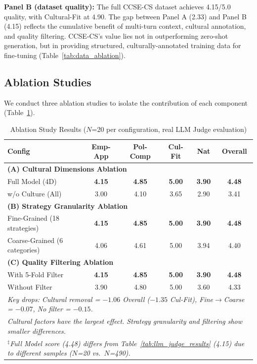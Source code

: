 \documentclass[11pt]{article}
\begin{document}
\textbf{Panel B (dataset quality):} The full CCSE-CS dataset achieves 4.15/5.0 quality, with Cultural-Fit at 4.90. The gap between Panel A (2.33) and Panel B (4.15) reflects the cumulative benefit of multi-turn context, cultural annotation, and quality filtering. CCSE-CS's value lies not in outperforming zero-shot generation, but in providing structured, culturally-annotated training data for fine-tuning (Table~\ref{tab:data_ablation}).

\subsection{Ablation Studies}

We conduct three ablation studies to isolate the contribution of each component (Table~\ref{tab:ablation_results}).

\begin{table}[t]
\centering
\caption{Ablation Study Results ($N$=20 per configuration, real LLM Judge evaluation)}
\label{tab:ablation_results}
\begin{tabular}{lccccc}
\toprule
\textbf{Config} & \textbf{Emp-App} & \textbf{Pol-Comp} & \textbf{Cul-Fit} & \textbf{Nat} & \textbf{Overall} \\
\midrule
\multicolumn{6}{l}{\textbf{(A) Cultural Dimensions Ablation}} \\
Full Model (4D) & \textbf{4.15} & \textbf{4.85} & \textbf{5.00} & \textbf{3.90} & \textbf{4.48} \\
w/o Culture (All) & 3.00 & 4.10 & 3.65 & 2.90 & 3.41 \\
\midrule
\multicolumn{6}{l}{\textbf{(B) Strategy Granularity Ablation}} \\
Fine-Grained (18 strategies) & \textbf{4.15} & \textbf{4.85} & \textbf{5.00} & \textbf{3.90} & \textbf{4.48} \\
Coarse-Grained (6 categories) & 4.06 & 4.61 & 5.00 & 3.94 & 4.40 \\
\midrule
\multicolumn{6}{l}{\textbf{(C) Quality Filtering Ablation}} \\
With 5-Fold Filter & \textbf{4.15} & \textbf{4.85} & \textbf{5.00} & \textbf{3.90} & \textbf{4.48} \\
Without Filter & 3.90 & 4.80 & 5.00 & 3.60 & 4.33 \\
\midrule
\multicolumn{6}{l}{\footnotesize \textit{Key drops: Cultural removal = $-1.06$ Overall ($-1.35$ Cul-Fit), Fine$\to$Coarse = $-0.07$, No filter = $-0.15$.}} \\
\multicolumn{6}{l}{\footnotesize \textit{Cultural factors have the largest effect. Strategy granularity and filtering show smaller differences.}} \\
\multicolumn{6}{l}{\footnotesize \textit{$^{\ddagger}$Full Model score (4.48) differs from Table~\ref{tab:llm_judge_results} (4.15) due to different samples ($N$=20 vs.\ $N$=490).}} \\
\bottomrule
\end{tabular}
\end{table}
\end{document}

